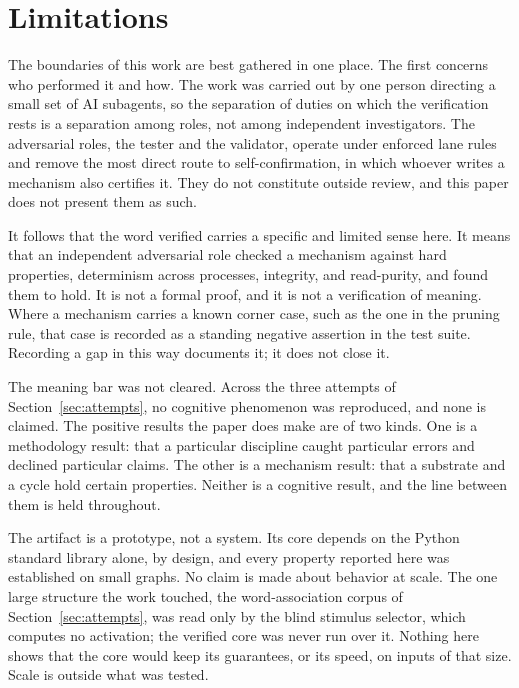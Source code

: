 \documentclass[11pt]{article}
\begin{document}
\section{Limitations}\label{sec:limitations}

The boundaries of this work are best gathered in one place. The first concerns who
performed it and how. The work was carried out by one person directing a small set of AI
subagents, so the separation of duties on which the verification rests is a separation
among roles, not among independent investigators. The adversarial roles, the tester and
the validator, operate under enforced lane rules and remove the most direct route to
self-confirmation, in which whoever writes a mechanism also certifies it. They do not
constitute outside review, and this paper does not present them as such.

It follows that the word verified carries a specific and limited sense here. It means that
an independent adversarial role checked a mechanism against hard properties, determinism
across processes, integrity, and read-purity, and found them to hold. It is not a formal
proof, and it is not a verification of meaning. Where a mechanism carries a known corner
case, such as the one in the pruning rule, that case is recorded as a standing negative
assertion in the test suite. Recording a gap in this way documents it; it does not close
it.

The meaning bar was not cleared. Across the three attempts of Section~\ref{sec:attempts},
no cognitive phenomenon was reproduced, and none is claimed. The positive results the paper
does make are of two kinds. One is a methodology result: that a particular discipline
caught particular errors and declined particular claims. The other is a mechanism result:
that a substrate and a cycle hold certain properties. Neither is a cognitive result, and
the line between them is held throughout.

The artifact is a prototype, not a system. Its core depends on the Python standard library
alone, by design, and every property reported here was established on small graphs. No
claim is made about behavior at scale. The one large structure the work touched, the
word-association corpus of Section~\ref{sec:attempts}, was read only by the blind stimulus
selector, which computes no activation; the verified core was never run over it. Nothing
here shows that the core would keep its guarantees, or its speed, on inputs of that size.
Scale is outside what was tested.
\end{document}
